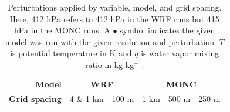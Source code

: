 \documentclass[draft]{agujournal2019}
\begin{document}
{
\begin{table}
    \centering
    \caption{Perturbations applied by variable, model, and grid spacing. Here,
    412 hPa refers to 412 hPa in the WRF runs but 415 hPa in the MONC runs. A
    $\bullet{}$ symbol indicates the given model was run with the given
    resolution and perturbation. $T$ is potential temperature in K and
    $q$ is water vapor mixing ratio in kg kg$^{-1}$.}
    \label{tab:pert_runs}
    \renewcommand{\arraystretch}{0.6}
    \footnotesize
    \begin{tabular}{llrccccc}
        \multicolumn{3}{r}{\textbf{Model}} & \multicolumn{2}{c}{\textbf{WRF}} & \multicolumn{3}{c}{\textbf{MONC}} \\
        \multicolumn{3}{r}{\textbf{Grid spacing}} & 4 \& 1 km & 100 m & 1 km & 500 m & 250 m \\
        

\end{tabular}
\end{table}}
\end{document}
